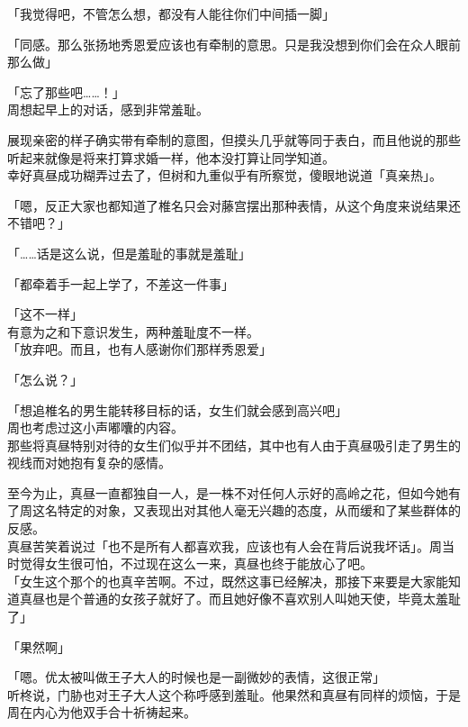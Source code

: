 「我觉得吧，不管怎么想，都没有人能往你们中间插一脚」

「同感。那么张扬地秀恩爱应该也有牵制的意思。只是我没想到你们会在众人眼前那么做」

「忘了那些吧……！」\\

周想起早上的对话，感到非常羞耻。

展现亲密的样子确实带有牵制的意图，但摸头几乎就等同于表白，而且他说的那些听起来就像是将来打算求婚一样，他本没打算让同学知道。\\

幸好真昼成功糊弄过去了，但树和九重似乎有所察觉，傻眼地说道「真亲热」。

「嗯，反正大家也都知道了椎名只会对藤宫摆出那种表情，从这个角度来说结果还不错吧？」

「……话是这么说，但是羞耻的事就是羞耻」

「都牵着手一起上学了，不差这一件事」

「这不一样」\\

有意为之和下意识发生，两种羞耻度不一样。\\

「放弃吧。而且，也有人感谢你们那样秀恩爱」

「怎么说？」

「想追椎名的男生能转移目标的话，女生们就会感到高兴吧」\\

周也考虑过这小声嘟囔的内容。\\

那些将真昼特别对待的女生们似乎并不团结，其中也有人由于真昼吸引走了男生的视线而对她抱有复杂的感情。

至今为止，真昼一直都独自一人，是一株不对任何人示好的高岭之花，但如今她有了周这名特定的对象，又表现出对其他人毫无兴趣的态度，从而缓和了某些群体的反感。\\

真昼苦笑着说过「也不是所有人都喜欢我，应该也有人会在背后说我坏话」。周当时觉得女生很可怕，不过现在这么一来，真昼也终于能放心了吧。\\

「女生这个那个的也真辛苦啊。不过，既然这事已经解决，那接下来要是大家能知道真昼也是个普通的女孩子就好了。而且她好像不喜欢别人叫她天使，毕竟太羞耻了」

「果然啊」

「嗯。优太被叫做王子大人的时候也是一副微妙的表情，这很正常」\\

听柊说，门胁也对王子大人这个称呼感到羞耻。他果然和真昼有同样的烦恼，于是周在内心为他双手合十祈祷起来。\\

